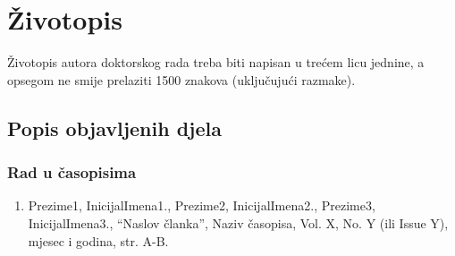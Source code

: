 \renewcommand{\leftmark}{Životopis}
\chapter*{Životopis}

Životopis autora doktorskog rada treba biti napisan u trećem licu jednine, a opsegom ne smije prelaziti 1500 znakova (uključujući razmake).


\section*{Popis objavljenih djela}


\subsection*{Rad u časopisima}

\begin{enumerate}
\item Prezime1, InicijalImena1., Prezime2, InicijalImena2., Prezime3, InicijalImena3., ``Naslov članka'', Naziv časopisa, Vol. X, No. Y (ili Issue Y), mjesec i godina, str. A-B.
\end{enumerate}
